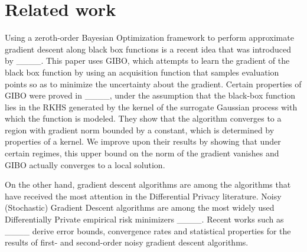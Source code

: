 \section{Related work}
Using a zeroth-order Bayesian Optimization framework to perform approximate gradient descent along black box functions is a recent idea that was introduced by ____. This paper uses GIBO, which attempts to learn the gradient of the black box function by using an acquisition function that samples evaluation points so as to minimize the uncertainty about the gradient. Certain properties of GIBO were proved in ____, under the assumption that the black-box function lies in the RKHS generated by the kernel of the surrogate Gaussian process with which the function is modeled. They show that the algorithm converges to a region with gradient norm bounded by a constant, which is determined by properties of a kernel. We improve upon their results by showing that under certain regimes, this upper bound on the norm of the gradient vanishes and GIBO actually converges to a local solution. 

On the other hand, gradient descent algorithms are among the algorithms that have received the most attention in the Differential Privacy literature. Noisy (Stochastic) Gradient Descent algorithms are among the most widely used Differentially Private empirical risk minimizers ____. Recent works such as ____ derive error bounds, convergence rates and statistical properties  for the results of first- and second-order noisy gradient descent algorithms.